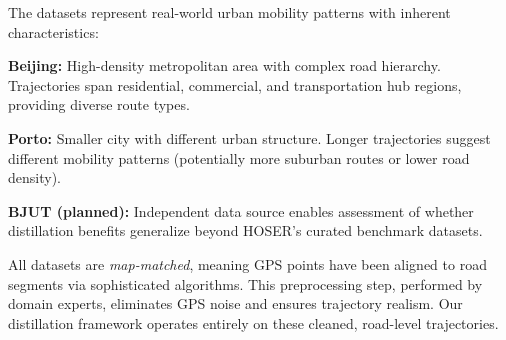 The datasets represent real-world urban mobility patterns with inherent characteristics:

\textbf{Beijing:} High-density metropolitan area with complex road hierarchy. Trajectories span residential, commercial, and transportation hub regions, providing diverse route types.

\textbf{Porto:} Smaller city with different urban structure. Longer trajectories suggest different mobility patterns (potentially more suburban routes or lower road density).

\textbf{BJUT (planned):} Independent data source enables assessment of whether distillation benefits generalize beyond HOSER's curated benchmark datasets.

All datasets are \emph{map-matched}, meaning GPS points have been aligned to road segments via sophisticated algorithms. This preprocessing step, performed by domain experts, eliminates GPS noise and ensures trajectory realism. Our distillation framework operates entirely on these cleaned, road-level trajectories.

